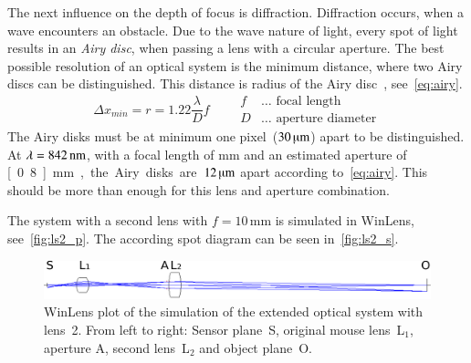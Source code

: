 \documentclass[12pt,a4paper]{article}
\begin{document}
The next influence on the depth of focus is diffraction.
Diffraction occurs, when a wave encounters an obstacle.
Due to the wave nature of light, every spot of light results in an \emph{Airy disc}, when passing a lens with a circular aperture.
The best possible resolution of an optical system is the minimum distance, where two Airy discs can be distinguished.
This distance is radius of the Airy disc~\cite{jaeger}, see~\autoref{eq:airy}. %
\begin{equation}
\label{eq:airy}
\Delta x_{min} = r = 1.22 \frac{\lambda}{D} f \qquad
\begin{aligned}
f & \dots \text{ focal length}\\
D & \dots \text{ aperture diameter}
\end{aligned}
\end{equation}
The Airy disks must be at minimum one pixel~($\unit[30]{\muup m}$) apart to be distinguished.
At $\lambda = \unit[842]{nm}$, with a focal length of \unit[10]{mm} and an estimated aperture of \unit[0.8]{mm}, the Airy disks are~$\unit[12]{\muup m}$ apart according to~\autoref{eq:airy}.
This should be more than enough for this lens and aperture combination.

The system with a second lens with $f=10$\,mm is simulated in WinLens, see~\autoref{fig:ls2_p}.
The according spot diagram can be seen in~\autoref{fig:ls2_s}.

\begin{figure}[htbp] %
\begin{center}
\includegraphics[width=1\columnwidth]{figures/lens_system_l2}
\caption{\label{fig:ls2_p}
WinLens plot of the simulation of the extended optical system with lens~2.
From left to right:
Sensor plane~S,
original mouse lens~L$_1$,
aperture A,
second lens~L$_2$ and
object plane~O.
}
\end{center}
\end{figure}
\end{document}
